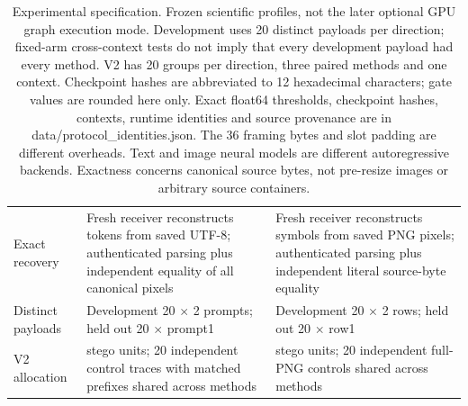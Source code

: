 \begin{table}[t]
\begin{tabular}{@{}>{\raggedright\arraybackslash}p{0.180\pubtablewidth}>{\raggedright\arraybackslash}p{0.410\pubtablewidth}>{\raggedright\arraybackslash}p{0.410\pubtablewidth}@{}}
Exact recovery & Fresh receiver reconstructs tokens from saved UTF-8; authenticated parsing plus independent equality of all canonical pixels & Fresh receiver reconstructs symbols from saved PNG pixels; authenticated parsing plus independent literal source-byte equality \\[4pt]
Distinct payloads & Development 20 $\times$ 2 prompts; held out 20 $\times$ prompt1 & Development 20 $\times$ 2 rows; held out 20 $\times$ row1 \\[4pt]
V2 allocation & 60 stego units; 20 independent control traces with matched prefixes shared across methods & 60 stego units; 20 independent full-PNG controls shared across methods \\[4pt]
\bottomrule
\end{tabular}
\caption{Experimental specification. Frozen scientific profiles, not the later optional GPU graph execution mode. Development uses 20 distinct payloads per direction; fixed-arm cross-context tests do not imply that every development payload had every method. V2 has 20 groups per direction, three paired methods and one context. Checkpoint hashes are abbreviated to 12 hexadecimal characters; gate values are rounded here only. Exact float64 thresholds, checkpoint hashes, contexts, runtime identities and source provenance are in data/protocol\_identities.json. The 36 framing bytes and slot padding are different overheads. Text and image neural models are different autoregressive backends. Exactness concerns canonical source bytes, not pre-resize images or arbitrary source containers.}
\label{tab:table1_specification}
\end{table}
